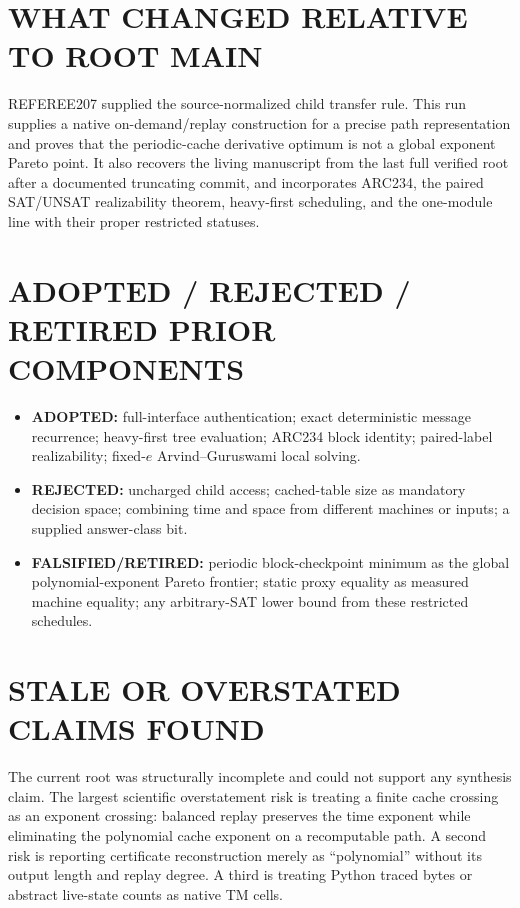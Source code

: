 \documentclass[11pt]{article}
\begin{document}
\section{WHAT CHANGED RELATIVE TO ROOT MAIN}

REFEREE207 supplied the source-normalized child transfer rule.  This run supplies a native
on-demand/replay construction for a precise path representation and proves that the periodic-cache
derivative optimum is not a global exponent Pareto point.  It also recovers the living manuscript
from the last full verified root after a documented truncating commit, and incorporates ARC234, the
paired SAT/UNSAT realizability theorem, heavy-first scheduling, and the one-module line with their
proper restricted statuses.

\section{ADOPTED / REJECTED / RETIRED PRIOR COMPONENTS}

\begin{itemize}
\item \textbf{ADOPTED:} full-interface authentication; exact deterministic message recurrence;
heavy-first tree evaluation; ARC234 block identity; paired-label realizability; fixed-$e$
Arvind--Guruswami local solving.
\item \textbf{REJECTED:} uncharged child access; cached-table size as mandatory decision space;
combining time and space from different machines or inputs; a supplied answer-class bit.
\item \textbf{FALSIFIED/RETIRED:} periodic block-checkpoint minimum as the global polynomial-exponent
Pareto frontier; static proxy equality as measured machine equality; any arbitrary-SAT lower bound
from these restricted schedules.
\end{itemize}

\section{STALE OR OVERSTATED CLAIMS FOUND}

The current root was structurally incomplete and could not support any synthesis claim.  The largest
scientific overstatement risk is treating a finite cache crossing as an exponent crossing: balanced
replay preserves the time exponent while eliminating the polynomial cache exponent on a recomputable
path.  A second risk is reporting certificate reconstruction merely as ``polynomial'' without its
output length and replay degree.  A third is treating Python traced bytes or abstract live-state
counts as native TM cells.
\end{document}

